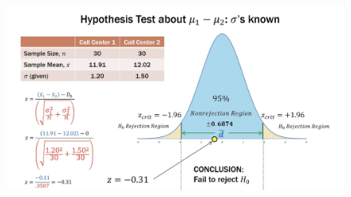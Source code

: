 \documentclass{article}
\begin{document}
\begin{figure}[H]
    \centering
    \includegraphics[width=1\linewidth]{images/2sampzexample.png}
\end{figure}
\end{document}
